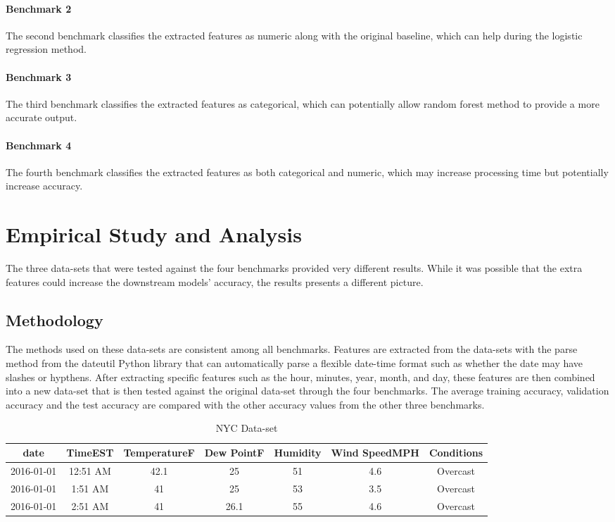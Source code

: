 \documentclass{article}
\begin{document}
\paragraph{Benchmark 2}
The second benchmark classifies the extracted features as numeric along with the original baseline, which can help during the logistic regression method.

\paragraph{Benchmark 3}
The third benchmark classifies the extracted features as categorical, which can potentially allow random forest method to provide a more accurate output.

\paragraph{Benchmark 4}
The fourth benchmark classifies the extracted features as both categorical and numeric, which may increase processing time but potentially increase accuracy. 

\section{Empirical Study and Analysis}
The three data-sets that were tested against the four benchmarks provided very different results. While it was possible that the extra features could increase the downstream models' accuracy, the results presents a different picture.

\subsection{Methodology}
The methods used on these data-sets are consistent among all benchmarks. Features are extracted from the data-sets with the parse method from the dateutil Python library that can automatically parse a flexible date-time format such as whether the date may have slashes or hypthens. After extracting specific features such as the hour, minutes, year, month, and day, these features are then combined into a new data-set that is then tested against the original data-set through the four benchmarks. The average training accuracy, validation accuracy and the test accuracy are compared with the other accuracy values from the other three benchmarks. 

\def\arraystretch{1.5}
\begin{table}[ht]
\caption{NYC Data-set}
\centering
\begin{tabular}{|c|c|c|c|c|c|c|}
\hline
date & TimeEST & TemperatureF & Dew PointF & Humidity & Wind SpeedMPH & Conditions \\
\hline
2016-01-01 & 12:51 AM &	42.1 & 25 & 51 & 4.6 & Overcast \\
\hline
2016-01-01 & 1:51 AM & 41 & 25 & 53 & 3.5 & Overcast \\
\hline
2016-01-01 & 2:51 AM & 41 & 26.1 & 55 & 4.6 & Overcast \\
\hline
\end{tabular}
\end{table}
\end{document}
